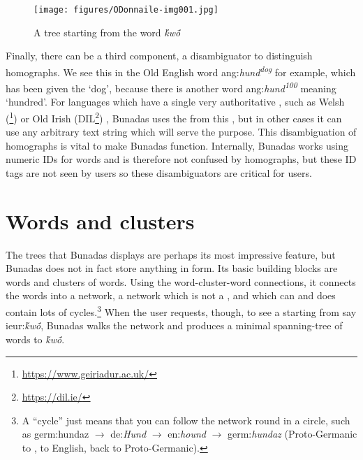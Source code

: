 \documentclass[output=paper,colorlinks,citecolor=brown]{langscibook}
\begin{document}

\begin{figure} 
\texttt{[image: figures/ODonnaile-img001.jpg]} \caption{A tree starting from the  word \textit{ḱwṓ}} \label{fig:odonnaile:1} 
\end{figure}



Finally, there can be a third component, a disambiguator to distinguish homographs. We see this in the Old English word ang:\textit{hund}\textit{\textsuperscript{dog}} for example, which has been given the  ‘dog’, because there is another word ang:\textit{hund}\textit{\textsuperscript{100}} meaning ‘hundred’. For languages which have a single very authoritative , such as Welsh (\footnote{ \url{https://www.geiriadur.ac.uk/} }) \citep{cod:Thomas2022} or Old Irish (DIL\footnote{ \url{https://dil.ie/} }) 
\citep{cod:TonerEtAL2019}, Bunadas uses the  from this , but in other cases it can use any arbitrary text string which will serve the purpose. This disambiguation of homographs is vital to make Bunadas function. Internally, Bunadas works using numeric IDs for words and is therefore not confused by homographs, but these ID tags are not seen by users so these disambiguators are critical for users.


\section{Words and clusters}

The trees that Bunadas displays are perhaps its most impressive feature, but Bunadas does not in fact store anything in  form. Its basic building blocks are words and clusters of words. Using the word-cluster-word connections, it connects the words into a network, a network which is not a , and which can and does contain lots of cycles.\footnote{A ``cycle” just means that you can follow the network round in a circle, such as germ:hundaz $\rightarrow$  de:\textit{Hund} $\rightarrow$ en:\textit{hound} $\rightarrow$ germ:\textit{hundaz} (Proto-Germanic to , to English, back to Proto-Germanic).} When the user requests, though, to see a  starting from say ieur:\textit{ḱwṓ}, Bunadas walks the network and produces a minimal spanning-tree of words  to \textit{ḱwṓ}.
\end{document}
